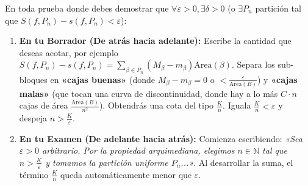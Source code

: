 \documentclass[11pt,a4paper]{article}
\begin{document}
\begin{tcolorbox}[colback=blue!3,colframe=primaryblue!80,arc=1mm,boxrule=0.6pt,title=\textbf{Ingeniería Inversa (Borrador) vs. Redacción Formal (Hoja de Examen)}]
En toda prueba donde debes demostrar que $\forall \varepsilon > 0, \exists \delta > 0$ (o $\exists P_n$ partición tal que $S(f,P_n) - s(f,P_n) < \varepsilon$):
\begin{enumerate}[label=\textbf{Fase \arabic*:}, leftmargin=3.5em]
  \item \textbf{En tu Borrador (De atrás hacia adelante):} Escribe la cantidad que deseas acotar, por ejemplo $S(f,P_n) - s(f,P_n) = \sum_{\beta \in P_n} (M_\beta - m_\beta)\text{Area}(\beta)$. Separa los sub-bloques en \textbf{«cajas buenas»} (donde $M_\beta - m_\beta = 0$ o $< \frac{\varepsilon}{\text{Area}(B)}$) y \textbf{«cajas malas»} (que tocan una curva de discontinuidad, donde hay a lo más $C\cdot n$ cajas de área $\frac{\text{Area}(B)}{n^2}$). Obtendrás una cota del tipo $\frac{K}{n}$. Iguala $\frac{K}{n} < \varepsilon$ y despeja $n > \frac{K}{\varepsilon}$.
  \item \textbf{En tu Examen (De adelante hacia atrás):} Comienza escribiendo: \emph{«Sea $\varepsilon > 0$ arbitrario. Por la propiedad arquimediana, elegimos $n \in \mathbb{N}$ tal que $n > \frac{K}{\varepsilon}$ y tomamos la partición uniforme $P_n$...»}. Al desarrollar la suma, el término $\frac{K}{n}$ queda automáticamente menor que $\varepsilon$.
\end{enumerate}
\end{tcolorbox}
\end{document}
